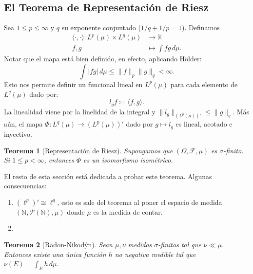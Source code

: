 \documentclass{article}
\newtheorem{Teorema}{Teorema}
\theoremstyle{plain}
\theoremstyle{definition}
\newcommand{\1}[1]{\mathbbm{1}\left\{ #1 \right\}}
\newcommand{\N}{\mathbb{N}}
\newcommand{\K}{\mathbb{K}}
\newcommand{\abs}[1]{\lvert #1 \rvert}
\newcommand{\norm}[1]{\lVert #1 \rVert}
\begin{document}
\subsection*{El Teorema de Representación de Riesz}

Sea \(1\le p \le \infty\) y \(q\) su exponente conjuntado (\(1/q+1/p = 1\)). Definamos
\begin{equation}
\begin{aligned}
  \langle \cdot,\cdot \rangle\colon L^p(\mu)\times L^q(\mu) &\to \K\\
  f,g &\mapsto \int fg\, d\mu.
\end{aligned}
\end{equation}
Notar que el mapa está bien definido, en efecto, aplicando Hölder:
\begin{displaymath}
  \int \abs{fg} \, d\mu \le \norm{f}_p \norm{g}_q < \infty.
\end{displaymath}
Esto nos permite definir un funcional lineal en \(L^p(\mu)\) para cada elemento de 
\(L^q(\mu)\) dado por:
\begin{displaymath}
  l_{g}f \coloneqq \langle f,g \rangle.
\end{displaymath}
La linealidad viene por la linelidad de la integral y \(\norm{l_g}_{(L^p(\mu))'} \le \norm{g}_{q}\). 
Más aún, el mapa \(\Phi\colon L^q(\mu) \to (L^p(\mu))'\) dado por \(g\mapsto l_g\) es lineal,
acotado e inyectivo.

\begin{Teorema}[Representación de Riesz]
  Supongamos que \((\Omega,\mathcal{F},\mu)\) es \(\sigma\)-finito. Si \(1\le p < \infty\), entonces
  \(\Phi\) es un isomorfismo isométrico. 
\end{Teorema}

El resto de esta sección está dedicada a probar este teorema. Algunas consecuencias:
\begin{enumerate}
  \item \((\ell^p)' \cong \ell^q\), esto es sale del teorema al poner el espacio de medida
  \((\N,\mathcal{P}(\N),\mu)\) donde \(\mu\) es la medida de contar. 
  \item 
\end{enumerate}

\begin{Teorema}[Radon-Nikodýn]
  Sean \(\mu,\nu\) medidas \(\sigma\)-finitas tal que \(\nu \ll \mu\). Entonces existe una única
  función \(h\) no negativa medible tal que \(\nu(E) = \int_{E} h\, d\mu\).  
\end{Teorema}
\end{document}
